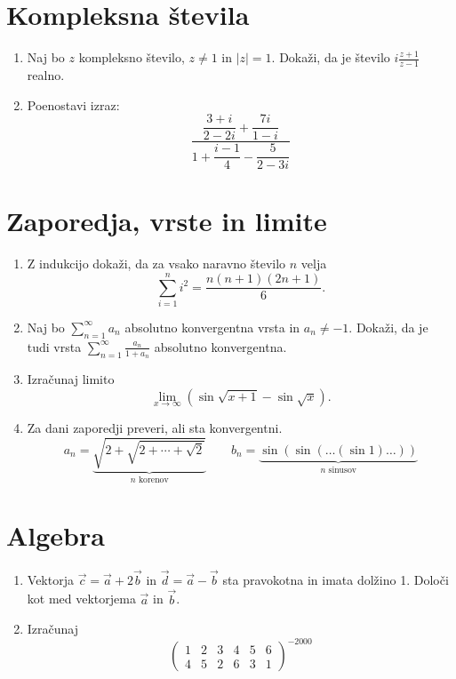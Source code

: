 \documentclass[a4paper,12pt]{article}
\begin{document}
\section*{Kompleksna števila}

\begin{enumerate}
    \item
    Naj bo $z$ kompleksno število,
    $z\ne1$ in $|z|=1$.
    Dokaži, da je število
    $i\frac{z+1}{z-1}$ realno.

    \item
    Poenostavi izraz:
    \[
    \frac{
        \dfrac{3+i}{2-2i}+\dfrac{7i}{1-i}
    }{
        1+\dfrac{i-1}{4}-\dfrac{5}{2-3i}
    }
    \]
\end{enumerate}

\section*{Zaporedja, vrste in limite}

\begin{enumerate}
    \item
    Z indukcijo dokaži, da za vsako naravno število
    $n$ velja
    \[
    \sum_{i=1}^{n}i^2=
    \frac{n(n+1)(2n+1)}{6}.
    \]

    \item
    Naj bo $\sum_{n=1}^{\infty}a_n$
    absolutno konvergentna vrsta in
    $a_n\ne-1$.
    Dokaži, da je tudi vrsta
    $\sum_{n=1}^{\infty}\frac{a_n}{1+a_n}$
    absolutno konvergentna.

    \item
    Izračunaj limito
    \[
    \lim_{x\to\infty}
    \left(\sin\sqrt{x+1}-\sin\sqrt{x}\right).
    \]

    \item
    Za dani zaporedji preveri, ali sta konvergentni.
    \[
    a_n=
    \underbrace{
    \sqrt{2+\sqrt{2+\cdots+\sqrt{2}}}
    }_{\text{\(n\) korenov}}
    \qquad
    b_n=
    \underbrace{
    \sin(\sin(\ldots(\sin1)\ldots))
    }_{\text{\(n\) sinusov}}
    \]
\end{enumerate}

\section*{Algebra}

\begin{enumerate}
    \item
    Vektorja
    $\vec{c}=\vec{a}+2\vec{b}$
    in
    $\vec{d}=\vec{a}-\vec{b}$
    sta pravokotna in imata dolžino 1.
    Določi kot med vektorjema
    $\vec{a}$ in $\vec{b}$.

    \item
    Izračunaj
    \[
    \begin{pmatrix}
    1&2&3&4&5&6\\
    4&5&2&6&3&1
    \end{pmatrix}^{-2000}
    \]
\end{enumerate}
\end{document}
